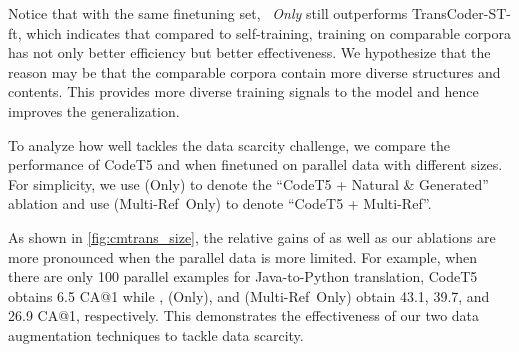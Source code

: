 Notice that with the same finetuning set, \textit{\CC\ Only} still outperforms TransCoder-ST-ft, which indicates that compared to self-training, training on comparable corpora has not only better efficiency but better effectiveness.
We hypothesize that the reason may be that the comparable corpora contain more diverse structures and contents. This provides more diverse training signals to the model and hence improves the generalization.

\begin{table}[t]
\centering
{}
\caption{Ablation studies of \cmtransours. We report CA@1 results. J-to-P and P-to-J stand for Java-to-Python and Python-to-Java results. We put the experiments on each type of comparable corpora in an individual block.}
\label{tab:cmtrans_ablation}
\end{table}



To analyze how well \cmtransours tackles the data scarcity challenge, we compare the performance of CodeT5 and \cmtransours when finetuned on parallel data with different sizes.
For simplicity, we use \cmtransours (\CC Only) to denote the ``CodeT5 + Natural \& Generated'' ablation 
and use \cmtransours (Multi-Ref\ Only) to denote ``CodeT5 + Multi-Ref''.

As shown in \autoref{fig:cmtrans_size}, the relative gains of \cmtransours as well as our ablations are more pronounced when the parallel data is more limited. 
For example, when there are only 100 parallel examples for Java-to-Python translation, CodeT5 obtains 6.5 CA@1 while \cmtransours, (\CC Only), and (Multi-Ref\ Only) obtain 43.1, 39.7, and 26.9 CA@1, respectively. 
This demonstrates the effectiveness of our two data augmentation techniques to tackle data scarcity.

